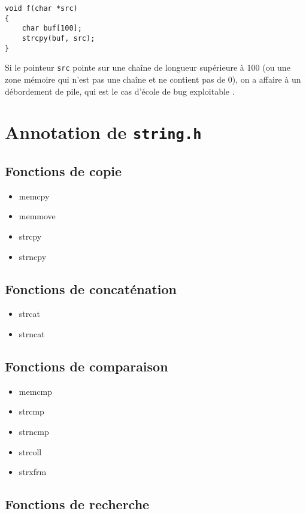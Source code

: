 \begin{Verbatim}
void f(char *src)
{
    char buf[100];
    strcpy(buf, src);
}
\end{Verbatim}

Si le pointeur \texttt{src} pointe sur une chaîne de longueur supérieure à 100
(ou une zone mémoire qui n'est pas une chaîne et ne contient pas de 0), on a
affaire à un débordement de pile, qui est le cas d'école de bug exploitable
\cite{SmashingTheStack}.

\wip{}

\section{Annotation de \texttt{string.h}}

\subsection{Fonctions de copie}

\begin{itemize}
\item memcpy
\item memmove
\item strcpy
\item strncpy
\end{itemize}

\subsection{Fonctions de concaténation}

\begin{itemize}
\item strcat
\item strncat
\end{itemize}

\subsection{Fonctions de comparaison}

\begin{itemize}
\item memcmp
\item strcmp
\item strncmp
\item strcoll
\item strxfrm
\end{itemize}

\subsection{Fonctions de recherche}

